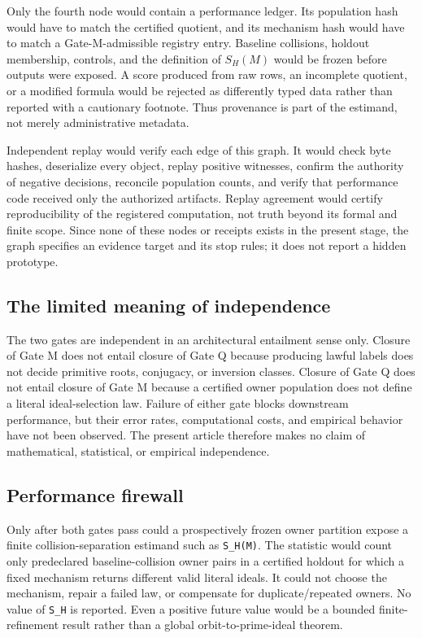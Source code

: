 \documentclass[11pt,a4paper]{article}
\begin{document}
Only the fourth node would contain a performance ledger. Its population hash would have to match the certified quotient, and its mechanism hash would have to match a Gate-M-admissible registry entry. Baseline collisions, holdout membership, controls, and the definition of \(S_H(M)\) would be frozen before outputs were exposed. A score produced from raw rows, an incomplete quotient, or a modified formula would be rejected as differently typed data rather than reported with a cautionary footnote. Thus provenance is part of the estimand, not merely administrative metadata.

Independent replay would verify each edge of this graph. It would check byte hashes, deserialize every object, replay positive witnesses, confirm the authority of negative decisions, reconcile population counts, and verify that performance code received only the authorized artifacts. Replay agreement would certify reproducibility of the registered computation, not truth beyond its formal and finite scope. Since none of these nodes or receipts exists in the present stage, the graph specifies an evidence target and its stop rules; it does not report a hidden prototype.

\subsection{The limited meaning of independence}

The two gates are independent in an architectural entailment sense only. Closure of Gate M does not entail closure of Gate Q because producing lawful labels does not decide primitive roots, conjugacy, or inversion classes. Closure of Gate Q does not entail closure of Gate M because a certified owner population does not define a literal ideal-selection law. Failure of either gate blocks downstream performance, but their error rates, computational costs, and empirical behavior have not been observed. The present article therefore makes no claim of mathematical, statistical, or empirical independence.

\subsection{Performance firewall}

Only after both gates pass could a prospectively frozen owner partition expose a finite collision-separation estimand such as \texttt{S\_H(M)}. The statistic would count only predeclared baseline-collision owner pairs in a certified holdout for which a fixed mechanism returns different valid literal ideals. It could not choose the mechanism, repair a failed law, or compensate for duplicate/repeated owners. No value of \texttt{S\_H} is reported. Even a positive future value would be a bounded finite-refinement result rather than a global orbit-to-prime-ideal theorem.
\end{document}
